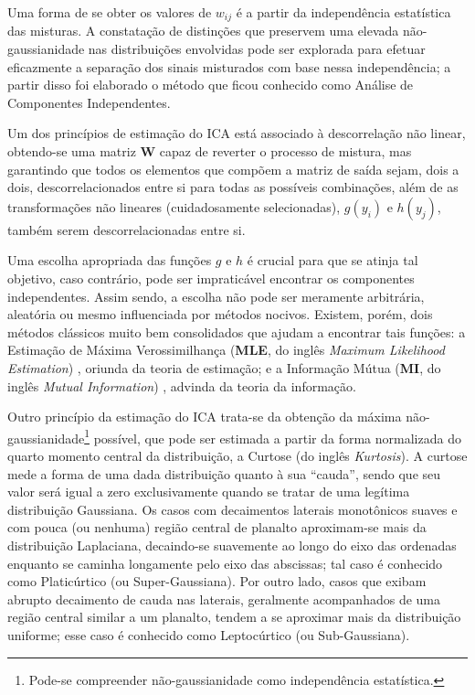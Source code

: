 Uma forma de se obter os valores de $w_{ij}$ é a partir da independência estatística das misturas. A constatação de distinções que preservem uma elevada não-gaussianidade nas distribuições envolvidas pode ser explorada para efetuar eficazmente a separação dos sinais misturados com base nessa independência; a partir disso foi elaborado o método que ficou conhecido como Análise de Componentes Independentes.





Um dos princípios de estimação do ICA está associado à descorrelação não linear, obtendo-se uma matriz $\mathbf{W}$ capaz de reverter o processo de mistura, mas garantindo que todos os elementos que compõem a matriz de saída sejam, dois a dois, descorrelacionados entre si para todas as possíveis combinações, além de as transformações não lineares (cuidadosamente selecionadas), $g(y_{i})$ e $h(y_{j})$, também serem descorrelacionadas entre si.

Uma escolha apropriada das funções $g$ e $h$ é crucial para que se atinja tal objetivo, caso contrário, pode ser impraticável encontrar os componentes independentes. Assim sendo, a escolha não pode ser meramente arbitrária, aleatória ou mesmo influenciada por métodos nocivos. Existem, porém, dois métodos clássicos muito bem consolidados que ajudam a encontrar tais funções: a Estimação de Máxima Verossimilhança (\textbf{MLE}, do inglês \textit{Maximum Likelihood Estimation}) \citep{ra1922mathematical, aldrich1997ra}, oriunda da teoria de estimação; e a Informação Mútua (\textbf{MI}, do inglês \textit{Mutual Information}) \citep{cover2012elements}, advinda da teoria da informação.


Outro princípio da estimação do ICA trata-se da obtenção da máxima não-gaussianidade\footnote{Pode-se compreender não-gaussianidade como independência estatística.} possível, que pode ser estimada a partir da forma normalizada do quarto momento central da distribuição, a Curtose (do inglês \textit{Kurtosis}). A curtose mede a forma de uma dada distribuição quanto à sua ``cauda'', sendo que seu valor será igual a zero exclusivamente quando se tratar de uma legítima distribuição Gaussiana. Os casos com decaimentos laterais monotônicos suaves e com pouca (ou nenhuma) região central de planalto aproximam-se mais da distribuição Laplaciana, decaindo-se suavemente ao longo do eixo das ordenadas enquanto se caminha longamente pelo eixo das abscissas; tal caso é conhecido como Platicúrtico (ou Super-Gaussiana). Por outro lado, casos que exibam abrupto decaimento de cauda nas laterais, geralmente acompanhados de uma região central similar a um planalto, tendem a se aproximar mais da distribuição uniforme; esse caso é conhecido como Leptocúrtico (ou Sub-Gaussiana).\\

